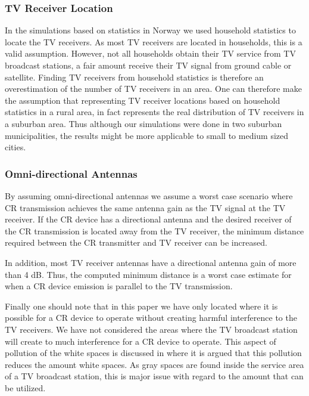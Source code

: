 \documentclass[journal,11pt,draftclsnofoot,onecolumn]{IEEEtran}
\begin{document}
\subsubsection{TV Receiver Location}
In the simulations based on statistics in Norway we used household statistics to locate the TV receivers. As most TV receivers are located in households, this is a valid assumption. However, not all households obtain their TV service from TV broadcast stations, a fair amount receive their TV signal from ground cable or satellite. Finding TV receivers from household statistics is therefore an overestimation of the number of TV receivers in an area. One can therefore make the assumption that representing TV receiver locations based on household statistics in a rural area, in fact represents the real distribution of TV receivers in a suburban area. Thus although our simulations were done in two suburban municipalities, the results might be more applicable to small to medium sized cities.

\subsubsection{Omni-directional Antennas}
By assuming omni-directional antennas we assume a worst case scenario where CR transmission achieves the same antenna gain as the TV signal at the TV receiver. If the CR device has a directional antenna and the desired receiver of the CR transmission is located away from the TV receiver, the minimum distance required between the CR transmitter and TV receiver can be increased.

In addition, most TV receiver antennas have a directional antenna gain of more than 4 dB. Thus, the computed minimum distance is a worst case estimate for when a CR device emission is parallel to the TV transmission.

Finally one should note that in this paper we have only located where it is possible for a CR device to operate without creating harmful interference to the TV receivers. We have not considered the areas where the TV broadcast station will create to much interference for a CR device to operate. This aspect of pollution of the white spaces is discussed in \cite{harrison} where it is argued that this pollution reduces the amount white spaces. As gray spaces are found inside the service area of a TV broadcast station, this is major issue with regard to the amount that can be utilized.
\end{document}
